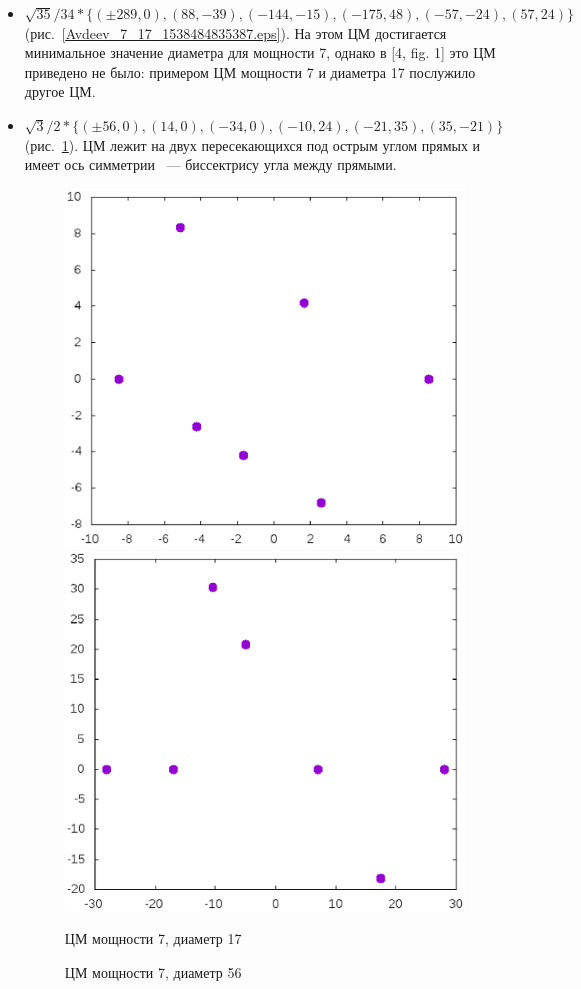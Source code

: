 \documentclass[12pt]{article}
\begin{document}
\begin{itemize}
\setlength{\itemsep}{-1mm}


\item
$\sqrt{35}/{34} * \{ (\pm 289, 0),
(88 , -39),
(-144 , -15),
(-175 , 48),
(-57 , -24),
(57 , 24)\} $
(рис.~\ref{Avdeev_7_17_1538484835387.eps}).
На этом ЦМ достигается минимальное значение диаметра для мощности 7,
однако в [4, fig. 1] это ЦМ приведено не было:
примером ЦМ мощности 7 и диаметра 17 послужило другое ЦМ.

\item
$\sqrt{3}/2 * \{
( \pm 56 , 0),
( 14 , 0),
( -34 , 0),
( -10 , 24),
( -21 , 35),
( 35 , -21)
\}
$
(рис.~\ref{Avdeev_7_56_1538484851696.eps}).
ЦМ лежит на двух пересекающихся под острым углом прямых и имеет ось симметрии
~--- биссектрису угла между прямыми.


\begin{figure}[htbp]
	\includegraphics[width=.48\linewidth]{Avdeev_7_17_1538484835387.eps}
	\hfill
	\includegraphics[width=.48\linewidth]{Avdeev_7_56_1538484851696.eps}
	\\
	\parbox{.48\linewidth}{\caption{ЦМ мощности 7, диаметр 17}\label{Avdeev_7_17_1538484835387.eps}}
	\hfill
	\parbox{.48\linewidth}{\caption{ЦМ мощности 7, диаметр 56}\label{Avdeev_7_56_1538484851696.eps}}
\end{figure}



\end{itemize}
\end{document}
